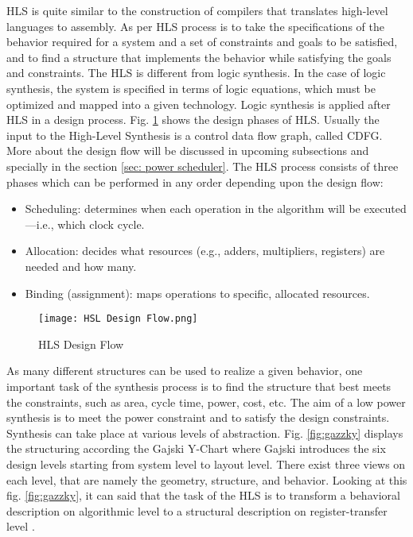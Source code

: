 \documentclass[conference]{IEEEtran}
\begin{document}
HLS is quite similar to the construction of compilers that translates high-level languages to assembly. As per \cite{52214} HLS process is to take the specifications of the behavior required for a system and a set of constraints and goals to be satisfied, and to find a structure that implements the behavior while satisfying the goals and constraints. The HLS is different from logic synthesis. In the case of logic synthesis, the system is specified in terms of logic equations, which must be optimized and mapped into a given technology. Logic synthesis is applied after HLS in a design process.
Fig. \ref{fig:HLS Design Flow} shows the design phases of HLS. Usually the input to the High-Level Synthesis is a control data flow graph, called CDFG. More about the design flow will be discussed in upcoming subsections and specially in the section \ref{sec: power scheduler}. The HLS process consists of three phases which can be performed in any order depending upon the design flow: 
\begin{itemize}
    \item Scheduling: determines when each operation in the algorithm will be executed—i.e., which clock cycle.
    \item Allocation: decides what resources (e.g., adders, multipliers, registers) are needed and how many.
    \item Binding (assignment): maps operations to specific, allocated resources.
\end{itemize}

\begin{figure}[h!]
    \centering
    \texttt{[image: HSL Design Flow.png]}
    \caption{HLS Design Flow \cite{Ret}}
    \label{fig:HLS Design Flow}
\end{figure}


As many different structures can be used to realize a given behavior, one important task of the synthesis process is to find the structure that best meets the constraints, such as area, cycle time, power, cost, etc. The aim of a low power synthesis is to meet the power constraint and to satisfy the design constraints. Synthesis can take place at various levels of abstraction. Fig. \ref{fig:gazzky} displays the structuring according the Gajski Y-Chart where Gajski introduces the six design levels starting from system level to layout level. There exist three views on each level, that are namely the geometry, structure, and behavior. Looking at this fig. \ref{fig:gazzky}, it can said that the task of the HLS is to transform a behavioral description on algorithmic level to a structural description on register-transfer level \cite{DDG92}.
\end{document}
